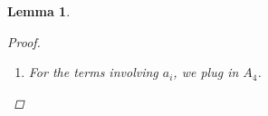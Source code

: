 \documentclass[12pt]{article}
\newtheorem{lemma}{Lemma}
\begin{document}
\begin{lemma}
\begin{proof}
\begin{enumerate}
\begin{align*}
&\langle \Psi(0), P_i^-(0; \lambda) \int_{-X_{i-1}}^0 \Phi^s(0, y; \lambda) P_i^-(y; \lambda)^{-1} \tilde{H}_i^-(y) dy \rangle \\
&= \int_{-X_{i-1}}^0 \langle \Psi(0), P_i^-(0; \lambda), \Phi^s(0, y; \lambda) P_i^-(y; \lambda)^{-1} \tilde{H}(y) \rangle dy \\
&= \int_{-X_{i-1}}^0 \langle \Psi(0), P_i^-(0; \lambda), \Phi^s(0, y; \lambda) P_i^-(y; \lambda)^{-1} H(y) \rangle dy + \mathcal{O}({e^{-\alpha X_m}})\\
&= \int_{-X_{i-1}}^0 \langle \Psi(0), \Theta(0, y) H(y) \rangle dy + \mathcal{O}(|\lambda| + {e^{-\alpha X_m}})\\
&= \int_{-X_{i-1}}^0 \langle \Theta(y, 0)^* \Psi_i(0), H(y) \rangle dy + \mathcal{O}(|\lambda| + {e^{-\alpha X_m}})\\
&= \int_{-X_{i-1}}^0 \langle \Psi(y), H(y) \rangle dy + \mathcal{O}(|\lambda| + {e^{-\alpha X_m}})\\
&= \int_{-\infty}^0 \langle \Psi(y), H(y) \rangle dy + \mathcal{O}(|\lambda| + {e^{-\alpha X_m}})\\
\end{align*}

The ``positive'' piece is similar, and gives us the other half of the Melnikov integral.

\item For the terms involving $a_i$, we plug in $A_4$.


\end{enumerate}
\end{proof}
\end{lemma}
\end{document}
